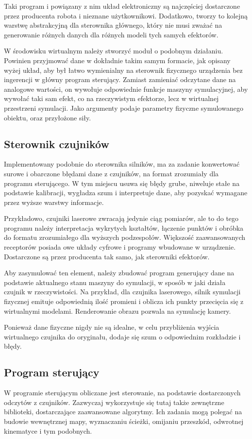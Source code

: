 		Taki program i powiązany z nim układ elektroniczny są najczęściej dostarczone przez producenta robota i nieznane użytkownikowi.
		Dodatkowo, tworzy to kolejną warstwę abstrakcyjną dla sterownika głównego, który nie musi zważać na generowanie różnych danych dla różnych modeli tych samych efektorów.
		
		W środowisku wirtualnym należy stworzyć moduł o podobnym działaniu.
		Powinien przyjmować dane w dokładnie takim samym formacie, jak opisany wyżej układ, aby był łatwo wymienialny na sterownik fizycznego urządzenia bez ingerencji w główny program sterujący.
		Zamiast zamieniać odczytane dane na analogowe wartości, on wywołuje odpowiednie funkcje maszyny symulacyjnej, aby wywołać taki sam efekt, co na rzeczywistym efektorze, lecz w wirtualnej przestrzeni symulacji.
		Jako argumenty podaje parametry fizyczne symulowanego obiektu, oraz przyłożone siły.
		

	\subsection{Sterownik czujników}
		Implementowany podobnie do sterownika silników, ma za zadanie konwertować surowe i obarczone błędami dane z czujników, na format zrozumiały dla programu sterującego.
		W tym miejscu usuwa się błędy grube, niweluje stałe na podstawie kalibracji, wygładza szum i interpretuje dane, aby pozyskać wymagane przez wyższe warstwy informacje.

		Przykładowo, czujniki laserowe zwracają jedynie ciąg pomiarów, ale to do tego programu należy interpretacja wykrytych kształtów, łączenie punktów i obróbka do formatu zrozumiałego dla wyższych podzespołów.
		Większość zaawansowanych receptorów posiada owe układy cyfrowe i programy wbudowane w urządzenie.
		Dostarczone są przez producenta tak samo, jak sterowniki efektorów.
		
		Aby zasymulować ten element, należy zbudować program generujący dane na podstawie aktualnego stanu maszyny do symulacji, w sposób w jaki działa czujnik w rzeczywistości.
		Na przykład, dla czujnika laserowego, silnik symulacji fizycznej emituje odpowiednią ilość promieni i oblicza ich punkty przecięcia się z wirtualnymi modelami.
		Renderowanie obrazu pozwala na symulację kamery.

		Ponieważ dane fizyczne nigdy nie są idealne, w celu przybliżenia wyjścia wirtualnego czujnika do oryginału, dodaje się szum o odpowiednim rozkładzie i błędy.

	\subsection{Program sterujący}
		W programie sterującym obliczane jest sterowanie, na podstawie dostarczonych odczytów z czujników.
		Zazwyczaj wykorzystuje się tutaj także zewnętrzne biblioteki, dostarczające zaawansowane algorytmy.
		Ich zadania mogą polegać na budowie wewnętrznej mapy, wyznaczaniu ścieżki, omijaniu przeszkód, odwrotnej kinematyce i tym podobnych.

